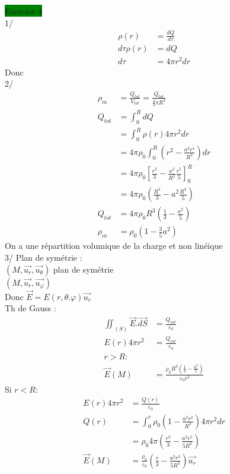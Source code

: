 \documentclass[a4paper]{article}
\begin{document}
\noindent \colorbox{green}{Exercice 4} \\
1/ \begin{align*}
    \rho(r) &= \frac{dQ}{d\tau}\\
    d\tau \rho(r) &= dQ\\
    d\tau &= 4\pi r^2 dr
\end{align*}
Donc \\
2/ \begin{align*}
    \rho_m &= \frac{Q_{tot}}{V_{tot}} = \frac{Q_{tot}}{\frac{4}{3}\pi R^3}\\
    Q_{tot}&= \int_{0}^{R}dQ\\
    &= \int_{0}^{R} \rho(r)4\pi r^2 dr \\
    &= 4\pi \rho_0 \int_{0}^{R} (r^2 - \frac{a^2 r^4}{R^2})dr\\
    &= 4 \pi \rho_0 [\frac{r^3}{3}-\frac{a^2}{R^2}\frac{r^5}{5}]^R_0\\
    &= 4\pi \rho_0 (\frac{R^3}{3}-a^2 \frac{R^3}{5})\\
    Q_{tot} &= 4\pi \rho_0 R^3(\frac{1}{3}-\frac{a^2}{5})\\
    \rho_m &= \rho_0 (1-\frac{3}{5}a^2)
\end{align*}
On a une répartition volumique de la charge et non linéique \\
3/ Plan de symétrie : \\
\((M, \vec{u_r}, \vec{u_\theta})\) plan de symétrie \\
\((M, \vec{u_r}, \vec{u_\varphi})\)\\
Donc \(\vec{E}=E(r, \theta. \varphi)\vec{u_r}\)\\
Th de Gauss : \begin{align*}
    \iint_{(S)} \vec{E}.\vec{dS} &= \frac{Q_{int}}{\varepsilon_0}\\
    E(r) 4\pi r^2 &= \frac{Q_{int}}{\varepsilon_0}\\
    r > R : \\
    \vec{E}(M) &= \frac{\rho_0 R^3(\frac{1}{3} - \frac{a^2}{5})}{\varepsilon_0 r^2}
\end{align*}
Si \(r < R\): \begin{align*}
    E(r)4\pi r^2 &= \frac{Q(r)}{\varepsilon_0}\\
    Q(r) &= \int_{0}^{r} \rho_0 (1-\frac{a^2r^2}{R^2})4\pi r^2 dr \\
    &= \rho_0 4\pi (\frac{r^3}{3}-\frac{a^2r^5}{5R^2})\\
    \vec{E}(M) &= \frac{\rho_0}{\varepsilon_0}(\frac{r}{3} - \frac{a^2r^3}{5R^2}) \vec{u_r}
\end{align*}
\end{document}
